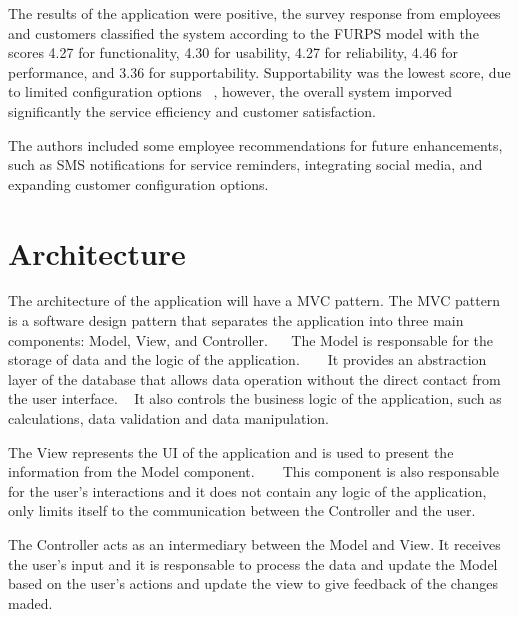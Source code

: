 The results of the application were positive, the survey response from employees and customers classified the system according to the \ac{FURPS} model with the scores 4.27 for functionality, 4.30 for usability, 4.27 for reliability, 4.46 for performance, and 3.36 for supportability.
Supportability was the lowest score, due to limited configuration options ~\cite{MAS_MOTORS}, however, the overall system imporved significantly the service efficiency and customer satisfaction. ~\cite{MAS_MOTORS}

The authors included some employee recommendations for future enhancements, such as SMS notifications for service reminders, integrating social media, and expanding customer configuration options.


\section{Architecture}

The architecture of the application will have a \ac{MVC} pattern. 
The \ac{MVC} pattern is a software design pattern that separates the application into three main components: Model, View, and Controller.~\cite{mvc_geeksforgeeks} ~\cite{MVC_StartupHouse}
The Model is responsable for the storage of data and the logic of the application.  ~\cite{mvc_geeksforgeeks} ~\cite{MVC_StartupHouse}
It provides an abstraction layer of the database that allows data operation without the direct contact from the user interface. ~\cite{MVC_StartupHouse}
It also controls the business logic of the application, such as calculations, data validation and data manipulation. ~\cite{MVC_StartupHouse}

The View represents the \ac{UI} of the application and is used to present the information from the Model component. ~\cite{mvc_geeksforgeeks} ~\cite{MVC_StartupHouse}
This component is also responsable for the user's interactions and it does not contain any logic of the application, only limits itself to the communication between the Controller and the user. ~\cite{MVC_StartupHouse}

The Controller acts as an intermediary between the Model and View.
It receives the user's input and it is responsable to process the data and update the Model based on the user's actions and update the view to give feedback of the changes maded. ~\cite{mvc_geeksforgeeks} ~\cite{MVC_StartupHouse}


